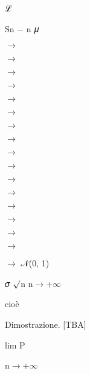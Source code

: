 \documentclass[a4paper,portrait,12pt]{article}
\begin{document}
\begin{flushleft}
ℒ
\end{flushleft}


\begin{flushleft}
Sn $-$ n 𝜇
\end{flushleft}


$\rightarrow$


$\rightarrow$


$\rightarrow$


$\rightarrow$


$\rightarrow$


$\rightarrow$


$\rightarrow$


$\rightarrow$


$\rightarrow$


$\rightarrow$


$\rightarrow$


$\rightarrow$


$\rightarrow$


$\rightarrow$


$\rightarrow$


$\rightarrow$


\begin{flushleft}
$\rightarrow$ 𝒩(0, 1)
\end{flushleft}


\begin{flushleft}
𝜎 $\surd$n n$\rightarrow$+$\infty$
\end{flushleft}





\begin{flushleft}
cio\`{e}
\end{flushleft}





\begin{flushleft}
Dimostrazione. [TBA]
\end{flushleft}





\begin{flushleft}
lim P
\end{flushleft}





\begin{flushleft}
n$\rightarrow$+$\infty$
\end{flushleft}
\end{document}
